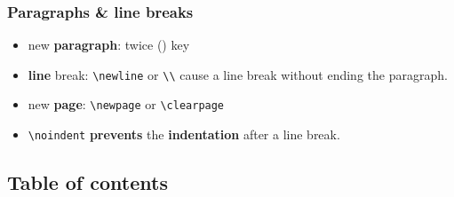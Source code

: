 \begin{frame}[fragile]
\frametitle{Paragraphs \& line breaks}

\begin{itemize}
	\item new \textbf{paragraph}: twice  () key
	
	\item \textbf{line} break: \lstinline|\newline| or \lstinline|\\| cause a line break without ending the paragraph.
	
	\item new \textbf{page}: \lstinline|\newpage| or \lstinline|\clearpage| 
	
	\item \lstinline|\noindent| \textbf{prevents} the \textbf{indentation} after a line break.
	
\end{itemize}

\end{frame}


\subsection{Table of contents}

